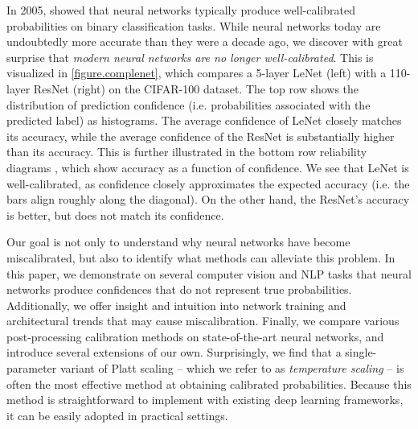 In 2005, \citet{niculescu2005predicting} showed that neural networks typically produce well-calibrated probabilities on binary classification tasks. While neural networks today are undoubtedly more accurate than they were a decade ago,
we discover with great surprise that \emph{modern neural networks are no longer well-calibrated}.
This is visualized in \autoref{figure.complenet}, which compares a 5-layer LeNet (left) \cite{lecun1998gradient} with a 110-layer ResNet (right) \cite{he2015deep} on the CIFAR-100 dataset.
The top row shows the distribution of prediction confidence (i.e. probabilities associated with the predicted label) as histograms.
The average confidence of LeNet closely matches its accuracy, while the average confidence of the ResNet is substantially higher than its accuracy.
This is further illustrated in the bottom row reliability diagrams \cite{degroot1983comparison,niculescu2005predicting}, which show accuracy as a function of confidence. We see that LeNet is well-calibrated, as confidence closely approximates the expected accuracy (i.e. the bars align roughly along the diagonal). On the other hand, the ResNet's accuracy is better, but does not match its confidence.

Our goal is not only to understand why neural networks have become miscalibrated, but also to identify what methods can alleviate this problem.
%
In this paper, we demonstrate on several computer vision and NLP tasks that neural networks produce confidences that do not represent true probabilities.
%
Additionally, we offer insight and intuition into network training and architectural trends that may cause miscalibration.
%
Finally, we compare various post-processing calibration methods on state-of-the-art neural networks, and introduce several extensions of our own. Surprisingly, we find that a single-parameter variant of Platt scaling \cite{platt1999probabilistic} -- which we refer to as \emph{temperature scaling} -- is often the most effective method at obtaining calibrated probabilities. Because this method is straightforward to implement with existing deep learning frameworks, it can be easily adopted in practical settings.
%
